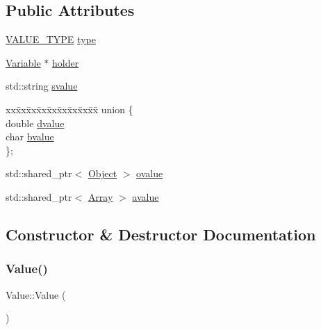 \subsection*{Public Attributes}
\begin{DoxyCompactItemize}
\item 
\hyperlink{statics_8h_a0674a913b8e8c8a9f265baab3646b565}{V\+A\+L\+U\+E\+\_\+\+T\+Y\+PE} \hyperlink{classValue_a4ee4412ce2c7b78bad42d8eb93294bea}{type}
\item 
\hyperlink{classVariable}{Variable} $\ast$ \hyperlink{classValue_af3b547ae64c4985008d6eb7c39868a3f}{holder}
\item 
std\+::string \hyperlink{classValue_a033edf7ba7f753cf274565fac27f9c7d}{svalue}
\item 
\begin{tabbing}
xx\=xx\=xx\=xx\=xx\=xx\=xx\=xx\=xx\=\kill
union \{\\
\>double \hyperlink{classValue_aac350b98b4eb19c6a9b79dae50e97cc6}{dvalue}\\
\>char \hyperlink{classValue_a6690838c4e198bd9b371108cffcd09e3}{bvalue}\\
\}; \\

\end{tabbing}\item 
std\+::shared\+\_\+ptr$<$ \hyperlink{classObject}{Object} $>$ \hyperlink{classValue_a04703ea830e0cb9a24286c588e69ee28}{ovalue}
\item 
std\+::shared\+\_\+ptr$<$ \hyperlink{classArray}{Array} $>$ \hyperlink{classValue_acb0c09facf0b3b0a88f6fb5a240c1783}{avalue}
\end{DoxyCompactItemize}


\subsection{Constructor \& Destructor Documentation}
\mbox{\label{classValue_abc2a5a2e6484fac66dae2539cc955667}} 
\subsubsection{\texorpdfstring{Value()}{Value()}}
{\footnotesize\ttfamily Value\+::\+Value (\begin{DoxyParamCaption}{ }\end{DoxyParamCaption})}

\mbox{\label{classValue_aceb26b90be781020c0c71ae5d16ca06f}} 
